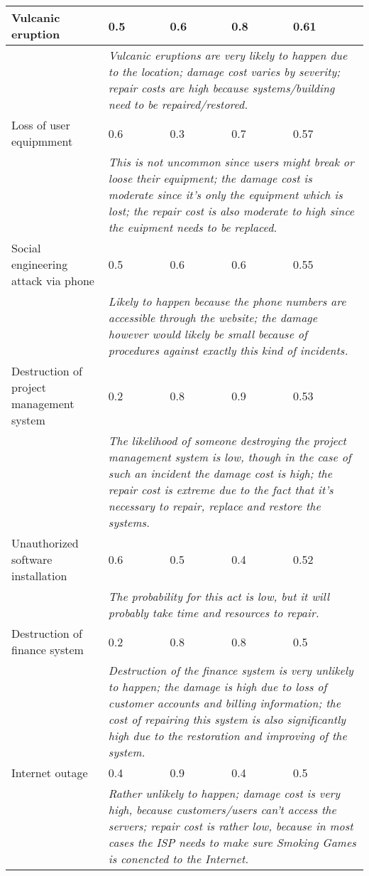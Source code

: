\begin{longtable}{| p{4.2cm} | p{1.8cm} | p{1.8cm} | p{1.8cm} | p{1.8cm} |}
		Vulcanic eruption & 0.5 & 0.6 & 0.8 & 0.61\\\hline
		& \multicolumn{4}{|p{8cm}|}{\textit{Vulcanic eruptions are very likely to happen due to the location; damage cost varies by severity; repair costs are high because systems/building need to be repaired/restored.}}\\\hline
		Loss of user equipmment & 0.6 & 0.3 & 0.7 & 0.57\\\hline
		& \multicolumn{4}{|p{8cm}|}{\textit{This is not uncommon since users might break or loose their equipment; the damage cost is moderate since it's only the equipment which is lost; the repair cost is also moderate to high since the euipment needs to be replaced.}}\\\hline
		Social engineering attack via phone & 0.5 & 0.6 & 0.6 & 0.55\\\hline
		& \multicolumn{4}{|p{8cm}|}{\textit{Likely to happen because the phone numbers are accessible through the website; the damage however would likely be small because of procedures against exactly this kind of incidents.}}\\\hline
		Destruction of project management system & 0.2 & 0.8 & 0.9 & 0.53\\\hline
		& \multicolumn{4}{|p{8cm}|}{\textit{The likelihood of someone destroying the project management system is low, though in the case of such an incident the damage cost is high; the repair cost is extreme due to the fact that it's necessary to repair, replace and restore the systems.}}\\\hline
		Unauthorized software installation & 0.6 & 0.5 & 0.4 & 0.52\\\hline
		& \multicolumn{4}{|p{8cm}|}{\textit{The probability for this act is low, but it will probably take time and resources to repair.}}\\\hline
		Destruction of finance system & 0.2 & 0.8 & 0.8 & 0.5\\\hline
		& \multicolumn{4}{|p{8cm}|}{\textit{Destruction of the finance system is very unlikely to happen; the damage is high due to loss of customer accounts and billing information; the cost of repairing this system is also significantly high due to the restoration and improving of the system.}}\\\hline
		Internet outage & 0.4 & 0.9 & 0.4 & 0.5\\\hline
		& \multicolumn{4}{|p{8cm}|}{\textit{Rather unlikely to happen; damage cost is very high, because customers/users can't access the servers;  repair cost is rather low, because in most cases the ISP needs to make sure Smoking Games is conencted to the Internet.}}\\\hline

\end{longtable}
